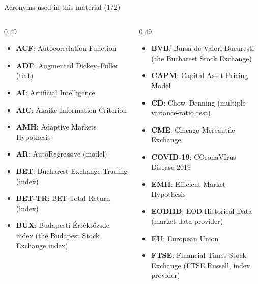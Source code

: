 {
\begin{frame}[noframenumbering]
    \titlepage
\end{frame}
}
\begin{frame}{Acronyms used in this material (1/2)}
\begin{columns}[T]
\begin{column}{0.49\textwidth}
\begin{itemize}\setlength{\itemsep}{0pt}
    \item \textbf{ACF}: Autocorrelation Function
    \item \textbf{ADF}: Augmented Dickey–Fuller (test)
    \item \textbf{AI}: Artificial Intelligence
    \item \textbf{AIC}: Akaike Information Criterion
    \item \textbf{AMH}: Adaptive Markets Hypothesis
    \item \textbf{AR}: AutoRegressive (model)
    \item \textbf{BET}: Bucharest Exchange Trading (index)
    \item \textbf{BET-TR}: BET Total Return (index)
    \item \textbf{BUX}: Budapesti Értéktőzsde index (the Budapest Stock Exchange index)
\end{itemize}
\end{column}
\begin{column}{0.49\textwidth}
\begin{itemize}\setlength{\itemsep}{0pt}
    \item \textbf{BVB}: Bursa de Valori București (the Bucharest Stock Exchange)
    \item \textbf{CAPM}: Capital Asset Pricing Model
    \item \textbf{CD}: Chow–Denning (multiple variance-ratio test)
    \item \textbf{CME}: Chicago Mercantile Exchange
    \item \textbf{COVID-19}: COronaVIrus Disease 2019
    \item \textbf{EMH}: Efficient Market Hypothesis
    \item \textbf{EODHD}: EOD Historical Data (market-data provider)
    \item \textbf{EU}: European Union
    \item \textbf{FTSE}: Financial Times Stock Exchange (FTSE Russell, index provider)
\end{itemize}
\end{column}
\end{columns}
\end{frame}
